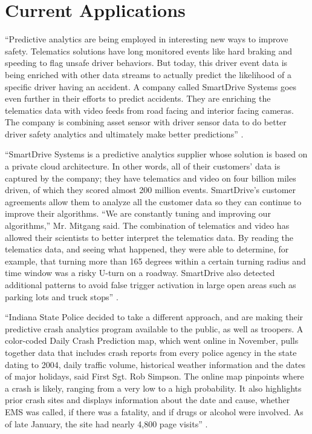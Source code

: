 \section{Current Applications}

``Predictive analytics are being employed in interesting new ways to improve safety. Telematics solutions have long monitored events like hard braking and speeding to flag unsafe driver behaviors.  But today, this driver event data is being enriched with other data streams to actually predict the likelihood of a specific driver having an accident. A company called SmartDrive Systems goes even further in their efforts to predict accidents.  They are enriching the telematics data with video feeds from road facing and interior facing cameras.  The company is combining asset sensor with driver sensor data to do better driver safety analytics and ultimately make better predictions'' \cite{Banker2016accident}.

``SmartDrive Systems is a predictive analytics supplier whose solution is based on a private cloud architecture.  In other words, all of their customers’ data is captured by the company; they have telematics and video on four billion miles driven, of which they scored almost 200 million events.   SmartDrive’s customer agreements allow them to analyze all the customer data so they can continue to improve their algorithms.  “We are constantly tuning and improving our algorithms,” Mr. Mitgang said. The combination of telematics and video has allowed their scientists to better interpret the telematics data. By reading the telematics data, and seeing what happened, they were able to determine, for example, that turning more than 165 degrees within a certain turning radius and time window was a risky U-turn on a roadway. SmartDrive also detected additional patterns to avoid false trigger activation in large open areas such as parking lots and truck stops'' \cite{Banker2016accident}.

``Indiana State Police decided to take a different approach, and are making their predictive crash analytics program available to the public, as well as troopers. A color-coded Daily Crash Prediction map, which went online in November, pulls together data that includes crash reports from every police agency in the state dating to 2004, daily traffic volume, historical weather information and the dates of major holidays, said First Sgt. Rob Simpson. The online map pinpoints where a crash is likely, ranging from a very low to a high probability. It also highlights prior crash sites and displays information about the date and cause, whether EMS was called, if there was a fatality, and if drugs or alcohol were involved. As of late January, the site had nearly 4,800 page visits'' \cite{Bergal2017sites}.

